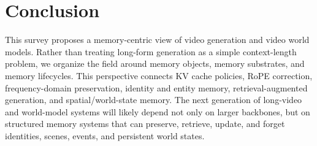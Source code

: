 \section{Conclusion}

This survey proposes a memory-centric view of video generation and video world models. Rather than treating long-form generation as a simple context-length problem, we organize the field around memory objects, memory substrates, and memory lifecycles. This perspective connects KV cache policies, RoPE correction, frequency-domain preservation, identity and entity memory, retrieval-augmented generation, and spatial/world-state memory. The next generation of long-video and world-model systems will likely depend not only on larger backbones, but on structured memory systems that can preserve, retrieve, update, and forget identities, scenes, events, and persistent world states.
